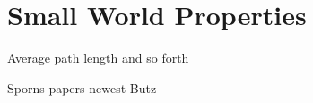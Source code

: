


\section{Small World Properties}\label{sec:small_world}


Average path length and so forth

Sporns papers   newest Butz





